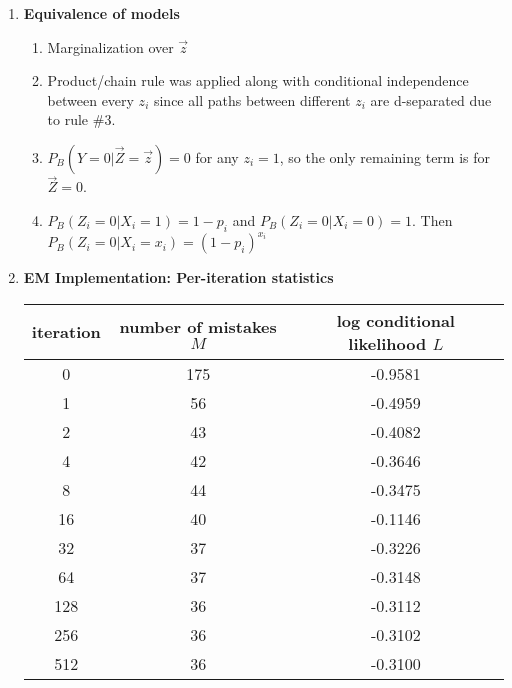 \documentclass[11]{article}
\begin{document}
\begin{enumerate}[label=(\alph*)]
\item{\textbf{Equivalence of models}}
\begin{enumerate}[label=(\roman*)]
\item
Marginalization over $\overrightarrow{z}$

\item
Product/chain rule was applied along with conditional independence between every $z_i$ since all paths between different $z_i$ are d-separated due to rule \#3.

\item
$P_B(Y=0|\overrightarrow{Z}=\overrightarrow{z})=0$ for any $z_i=1$, so the only remaining term is for $\overrightarrow{Z}=0$.

\item
$P_B(Z_i=0|X_i=1)=1-p_i$ and $P_B(Z_i=0|X_i=0)=1$. Then $P_B(Z_i=0|X_i=x_i)=(1-p_i)^{x_i}$
\end{enumerate}

\item{\textbf{EM Implementation: Per-iteration statistics}}
\begin{center}
\centering
\begin{tabular}{|c|c|c|}
\hline
\textbf{iteration} & \textbf{number of mistakes $M$} & \textbf{log conditional likelihood $L$} \\ \hline
0                  & 175                             & -0.9581                                 \\ \hline
1                  & 56                              & -0.4959                                 \\ \hline
2                  & 43                              & -0.4082                                 \\ \hline
4                  & 42                              & -0.3646                                 \\ \hline
8                  & 44                              & -0.3475                                 \\ \hline
16                 & 40                              & -0.1146                                 \\ \hline
32                 & 37                              & -0.3226                                 \\ \hline
64                 & 37                              & -0.3148                                 \\ \hline
128                & 36                              & -0.3112                                 \\ \hline
256                & 36                              & -0.3102                                 \\ \hline
512                & 36                              & -0.3100                                 \\ \hline
\end{tabular}
\end{center}


\end{enumerate}
\end{document}
